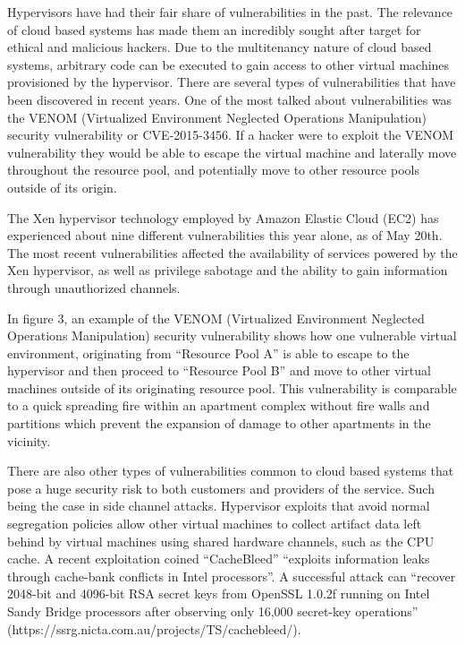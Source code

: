 \documentclass[./main.tex]{subfiles}
\begin{document}
Hypervisors have had their fair share of vulnerabilities in the past. The relevance of cloud based systems has made them an incredibly sought after target for ethical and malicious hackers. Due to the multitenancy nature of cloud based systems, arbitrary code can be executed to gain access to other virtual machines provisioned by the hypervisor. There are several types of vulnerabilities that have been discovered in recent years. One of the most talked about vulnerabilities was the VENOM (Virtualized Environment Neglected Operations Manipulation) security vulnerability or CVE-2015-3456. If a hacker were to exploit the VENOM vulnerability they would be able to escape the virtual machine and laterally move throughout the resource pool, and potentially move to other resource pools outside of its origin.

The Xen hypervisor technology employed by Amazon Elastic Cloud (EC2) has experienced about nine different vulnerabilities this year alone, as of May 20th. The most recent vulnerabilities affected the availability of services powered by the Xen hypervisor, as well as privilege sabotage and the ability to gain information through unauthorized channels.

In figure 3, an example of the VENOM (Virtualized Environment Neglected Operations Manipulation) security vulnerability shows how one vulnerable virtual environment, originating from “Resource Pool A” is able to escape to the hypervisor and then proceed to “Resource Pool B” and move to other virtual machines outside of its originating resource pool. This vulnerability is comparable to a quick spreading fire within an apartment complex without fire walls and partitions which prevent the expansion of damage to other apartments in the vicinity.

There are also other types of vulnerabilities common to cloud based systems that pose a huge security risk to both customers and providers of the service. Such being the case in side channel attacks. Hypervisor exploits that avoid normal segregation policies allow other virtual machines to collect artifact data left behind by virtual machines using shared hardware channels, such as the CPU cache. A recent exploitation coined “CacheBleed” “exploits information leaks through cache-bank conflicts in Intel processors”. A successful attack can “recover 2048-bit and 4096-bit RSA secret keys from OpenSSL 1.0.2f running on Intel Sandy Bridge processors after observing only 16,000 secret-key operations” (https://ssrg.nicta.com.au/projects/TS/cachebleed/).
\end{document}
